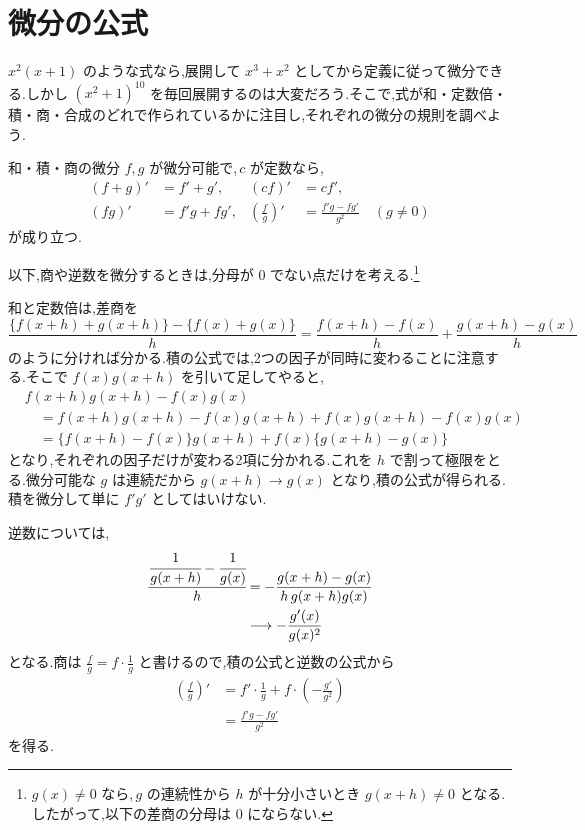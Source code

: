 \section{微分の公式}\label{節:微分法則}
$x^2(x+1)$ のような式なら,展開して $x^3+x^2$ としてから定義に従って微分できる.しかし $(x^2+1)^{10}$ を毎回展開するのは大変だろう.そこで,式が和・定数倍・積・商・合成のどれで作られているかに注目し,それぞれの微分の規則を調べよう.

\begin{theorem}{和・積・商の微分}
$f,g$ が微分可能で,\,$c$ が定数なら,
\begin{align*}
 (f+g)'&=f'+g',& (cf)'&=cf',\\
 (fg)'&=f'g+fg',&
 \left(\frac fg\right)'&=\frac{f'g-fg'}{g^2}\quad(g\ne0)
\end{align*}
が成り立つ.
\end{theorem}

以下,商や逆数を微分するときは,分母が $0$ でない点だけを考える.\footnote{$g(x)\ne0$ なら,\,$g$ の連続性から $h$ が十分小さいとき $g(x+h)\ne0$ となる.したがって,以下の差商の分母は $0$ にならない.}

和と定数倍は,差商を
\[
 \frac{\{f(x+h)+g(x+h)\}-\{f(x)+g(x)\}}h=\frac{f(x+h)-f(x)}h+\frac{g(x+h)-g(x)}h
\]
のように分ければ分かる.積の公式では,2つの因子が同時に変わることに注意する.そこで $f(x)g(x+h)$ を引いて足してやると,
\begin{align*}
 &f(x+h)g(x+h)-f(x)g(x)\\
 &\quad=f(x+h)g(x+h)-f(x)g(x+h)+f(x)g(x+h)-f(x)g(x)\\
 &\quad=\{f(x+h)-f(x)\}g(x+h)+f(x)\{g(x+h)-g(x)\}
\end{align*}
となり,それぞれの因子だけが変わる2項に分かれる.これを $h$ で割って極限をとる.微分可能な $g$ は連続だから $g(x+h)\to g(x)$ となり,積の公式が得られる.積を微分して単に $f'g'$ としてはいけない.

逆数については,
\begin{align*}
 \cfrac{\cfrac1{g(x+h)}-\cfrac1{g(x)}}h
 &=-\frac{g(x+h)-g(x)}{h\,g(x+h)g(x)}\\
 &\longrightarrow-\frac{g'(x)}{g(x)^2}
\end{align*}
となる.商は $\frac fg=f\cdot\frac1g$ と書けるので,積の公式と逆数の公式から
\begin{align*}
 \left(\frac fg\right)'
 &=f'\cdot\frac1g+f\cdot\left(-\frac{g'}{g^2}\right)\\
 &=\frac{f'g-fg'}{g^2}
\end{align*}
を得る.

